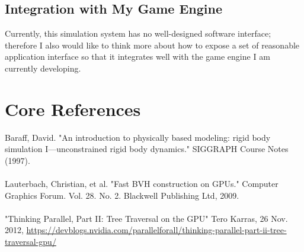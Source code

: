 \documentclass[11pt]{article}
\begin{document}
\subsection{Integration with My Game Engine}
\label{sec:orgb51250d}
Currently, this simulation system has no well-designed software interface; therefore I also would like to think more about how to expose a set of reasonable application interface so that it integrates well with the game engine I am currently developing.

\section{Core References}
\label{sec:org8004b10}
Baraff, David. "An introduction to physically based modeling: rigid body simulation I—unconstrained rigid body dynamics." SIGGRAPH Course Notes (1997).
\\
\\
Lauterbach, Christian, et al. "Fast BVH construction on GPUs." Computer Graphics Forum. Vol. 28. No. 2. Blackwell Publishing Ltd, 2009.
\\
\\
"Thinking Parallel, Part II: Tree Traversal on the GPU" Tero Karras, 26 Nov. 2012, \url{https://devblogs.nvidia.com/parallelforall/thinking-parallel-part-ii-tree-traversal-gpu/}
\end{document}
